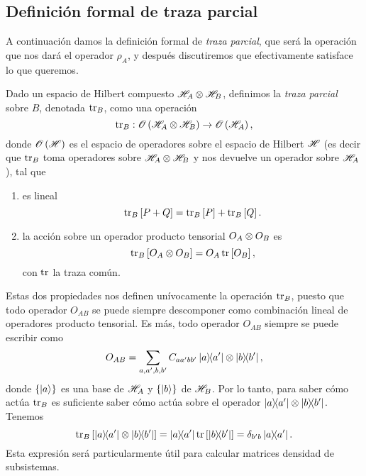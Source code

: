\documentclass[10pt, a4paper]{article}
\numberwithin{equation}{subsection}
\begin{document}
\subsection{Definición formal de traza parcial}

A continuación damos la definición formal de \emph{traza parcial}, que será la
operación que nos dará el operador $\rho_A$, y después discutiremos que
efectivamente satisface lo que queremos.

\bigbreak

Dado un espacio de Hilbert compuesto $\mathscr{H}_A\otimes\mathscr{H}_B$, definimos
la \emph{traza parcial} sobre $B$, denotada $\tr_B$, como una operación
\begin{equation}
  \tr_B: \mathscr{O}\left(\mathscr{H}_A\otimes\mathscr{H}_B\right) \rightarrow
  \mathscr{O}\left(\mathscr{H}_A\right),
\end{equation}
donde $\mathscr{O}\left(\mathscr{H}\right)$ es el espacio de operadores sobre el
espacio de Hilbert $\mathscr{H}$ (es decir que $\tr_B$ toma operadores sobre
$\mathscr{H}_A\otimes\mathscr{H}_B$ y nos devuelve un operador sobre $\mathscr{H}_A$),
tal que
\begin{enumerate}[label=(\alph*)]
  \item es lineal
    \begin{equation}
      \tr_B\left[P + Q\right] = \tr_B\left[P\right] + \tr_B\left[Q\right].
    \end{equation}
  \item la acción sobre un operador producto tensorial $O_{A}\otimes O_{B}$ es
    \begin{equation}
      \tr_B\left[O_A\otimes O_B\right] = O_A\tr\left[O_B\right],
    \end{equation}
    con $\tr$ la traza común.
\end{enumerate}
Estas dos propiedades nos definen unívocamente la operación $\tr_B$, puesto que
todo operador $O_{AB}$ se puede siempre descomponer como combinación lineal de
operadores producto tensorial. Es más, todo operador $O_{AB}$ siempre se puede
escribir como
\begin{equation}
  O_{AB} = \sum_{a,a',b,b'} C_{aa'bb'}\ketbra{a}{a'}\otimes\ketbra{b}{b'},
\end{equation}
donde $\set{\ket{a}}$ es una base de $\mathscr{H}_A$ y $\set{\ket{b}}$ de
$\mathscr{H}_B$. Por lo tanto, para saber cómo actúa $\tr_B$ es suficiente saber
cómo actúa sobre el operador $\ketbra{a}{a'}\otimes\ketbra{b}{b'}$. Tenemos
\begin{equation}
  \tr_B\left[\ketbra{a}{a'}\otimes\ketbra{b}{b'}\right] =
  \ketbra{a}{a'}\tr\left[\ketbra{b}{b'}\right] = \delta_{b'b}\ketbra{a}{a'}.
\end{equation}
Esta expresión será particularmente útil para calcular matrices densidad de
subsistemas.
\end{document}
